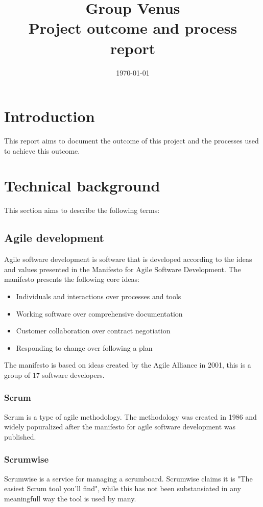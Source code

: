 \documentclass[12pt]{article}
\title{\textbf{Group Venus} \\ Project outcome and process report}
\date{\today}
\begin{document}
\subsectionfont{\fontsize{12}{14}\selectfont}

\maketitle

\pagebreak

\tableofcontents

\pagebreak


\section{Introduction}
This report aims to document the outcome of this project and the processes used to achieve this outcome.
\section{Technical background}
This section aims to describe the following terms:
\subsection{Agile development\cite{AgileSoftwareDevelopment2024}}
Agile software development is software that is developed according to the ideas and values presented in the 
Manifesto for Agile Software Development\cite{ManifestoAgileSoftware}.
The manifesto presents the following core ideas:
\begin{itemize}
    \item Individuals and interactions over processes and tools
    \item Working software over comprehensive documentation
    \item Customer collaboration over contract negotiation
    \item Responding to change over following a plan
\end{itemize}
The manifesto is based on ideas created by the Agile Alliance in 2001, 
this is a group of 17 software developers.
\subsubsection{Scrum\cite{Scrum2023}}
Scrum is a type of agile methodology. The methodology was created in 1986 and widely popuralized 
after the manifesto for agile software development was published.
\subsubsection{Scrumwise\cite{scrumwiseScrumToolsScrum}}
Scrumwise is a service for managing a scrumboard. Scrumwise claims it is "The easiest Scrum tool you'll find", 
while this has not been substansiated in any meaningfull way the tool is used by many.
\end{document}
